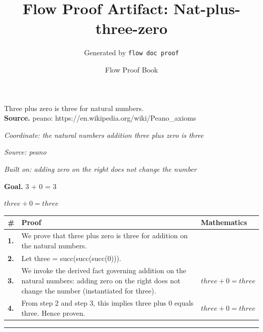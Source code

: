 \documentclass[11pt]{article}
\title{Flow Proof Artifact: Nat-plus-three-zero}
\author{Generated by \texttt{flow doc proof}}
\date{Flow Proof Book}
\theoremstyle{definition}
\begin{document}
\maketitle
Three plus zero is three for natural numbers.\\[0.5em]
\textbf{Source.} peano: https://en.wikipedia.org/wiki/Peano\_axioms\\[0.5em]
\bigskip
{}\par
\smallskip\noindent\textit{Coordinate: the natural numbers \cdot addition \cdot three plus zero is three}\par
\smallskip\noindent\textit{Source: peano}\par
\smallskip\noindent\textit{Built on: adding zero on the right does not change the number}\par
\medskip
\noindent\textbf{Goal.} 3 + 0 = 3\par
\noindent$\displaystyle three + 0 = three$\par
\medskip
\noindent
\begin{tabular}{@{} >{\raggedright\arraybackslash}p{} >{\raggedright\arraybackslash}p{} >{\raggedleft\arraybackslash}p{} @{}}
\textbf{\#} & \textbf{Proof} & \textbf{Mathematics} \\
\midrule
\textbf{1.} & We prove that three plus zero is three for addition on the natural numbers. & \\[0.45em]
\textbf{2.} & Let three = succ(succ(succ(0))). & \\[0.45em]
\textbf{3.} & We invoke the derived fact governing addition on the natural numbers: adding zero on the right does not change the number (instantiated for three). & $\displaystyle three + 0 = three$ \\[0.45em]
\textbf{4.} & From step 2 and step 3, this implies three plus 0 equals three. Hence proven. & $\displaystyle three + 0 = three$ \\[0.45em]
\bottomrule
\end{tabular}
\label{thm:Nat-addition-three_plus_zero_is_three}
\par\medskip\hrule
\end{document}
